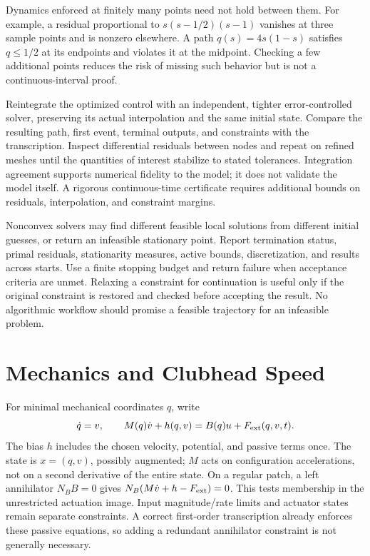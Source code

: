 Dynamics enforced at finitely many points need not hold between them. For
example, a residual proportional to $s(s-1/2)(s-1)$ vanishes at three sample
points and is nonzero elsewhere. A path $q(s)=4s(1-s)$ satisfies
$q\leq1/2$ at its endpoints and violates it at the midpoint. Checking a few
additional points reduces the risk of missing such behavior but is not a
continuous-interval proof.

Reintegrate the optimized control with an independent, tighter error-controlled
solver, preserving its actual interpolation and the same initial state.
Compare the resulting path, first event, terminal outputs, and constraints
with the transcription. Inspect differential residuals between nodes and
repeat on refined meshes until the quantities of interest stabilize to stated
tolerances. Integration agreement supports numerical fidelity to the model;
it does not validate the model itself. A rigorous continuous-time certificate
requires additional bounds on residuals, interpolation, and constraint margins.

Nonconvex solvers may find different feasible local solutions from different
initial guesses, or return an infeasible stationary point. Report termination
status, primal residuals, stationarity measures, active bounds, discretization,
and results across starts. Use a finite stopping budget and return failure
when acceptance criteria are unmet. Relaxing a constraint for continuation
is useful only if the original constraint is restored and checked before
accepting the result. No algorithmic workflow should promise a feasible
trajectory for an infeasible problem.

\section{Mechanics and Clubhead Speed}

For minimal mechanical coordinates $q$, write
\begin{equation}\label{eq:ocp_underactuation}
 \dot q=v,\qquad M(q)\dot v+h(q,v)=B(q)u+F_{\rm ext}(q,v,t).
\end{equation}
The bias $h$ includes the chosen velocity, potential, and passive terms once.
The state is $x=(q,v)$, possibly augmented; $M$ acts on configuration
accelerations, not on a second derivative of the entire state. On a regular
patch, a left annihilator $N_BB=0$ gives
$N_B(M\dot v+h-F_{\rm ext})=0$. This tests membership in the unrestricted
actuation image. Input magnitude/rate limits and actuator states remain
separate constraints. A correct first-order transcription already enforces
these passive equations, so adding a redundant annihilator constraint is
not generally necessary.

